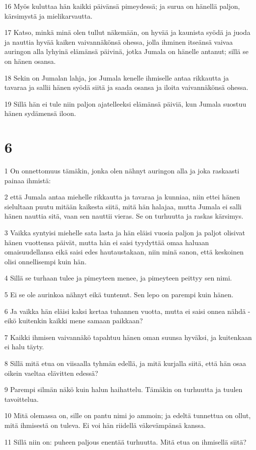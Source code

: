 \par 16 Myös kuluttaa hän kaikki päivänsä pimeydessä; ja surua on hänellä paljon, kärsimystä ja mielikarvautta.
\par 17 Katso, minkä minä olen tullut näkemään, on hyvää ja kaunista syödä ja juoda ja nauttia hyvää kaiken vaivannäkönsä ohessa, jolla ihminen itseänsä vaivaa auringon alla lyhyinä elämänsä päivinä, jotka Jumala on hänelle antanut; sillä se on hänen osansa.
\par 18 Sekin on Jumalan lahja, jos Jumala kenelle ihmiselle antaa rikkautta ja tavaraa ja sallii hänen syödä siitä ja saada osansa ja iloita vaivannäkönsä ohessa.
\par 19 Sillä hän ei tule niin paljon ajatelleeksi elämänsä päiviä, kun Jumala suostuu hänen sydämensä iloon.

\chapter{6}

\par 1 On onnettomuus tämäkin, jonka olen nähnyt auringon alla ja joka raskaasti painaa ihmistä:
\par 2 että Jumala antaa miehelle rikkautta ja tavaraa ja kunniaa, niin ettei hänen sielultaan puutu mitään kaikesta siitä, mitä hän halajaa, mutta Jumala ei salli hänen nauttia sitä, vaan sen nauttii vieras. Se on turhuutta ja raskas kärsimys.
\par 3 Vaikka syntyisi miehelle sata lasta ja hän eläisi vuosia paljon ja paljot olisivat hänen vuottensa päivät, mutta hän ei saisi tyydyttää omaa haluaan omaisuudellansa eikä saisi edes hautaustakaan, niin minä sanon, että keskoinen olisi onnellisempi kuin hän.
\par 4 Sillä se turhaan tulee ja pimeyteen menee, ja pimeyteen peittyy sen nimi.
\par 5 Ei se ole aurinkoa nähnyt eikä tuntenut. Sen lepo on parempi kuin hänen.
\par 6 Ja vaikka hän eläisi kaksi kertaa tuhannen vuotta, mutta ei saisi onnea nähdä - eikö kuitenkin kaikki mene samaan paikkaan?
\par 7 Kaikki ihmisen vaivannäkö tapahtuu hänen oman suunsa hyväksi, ja kuitenkaan ei halu täyty.
\par 8 Sillä mitä etua on viisaalla tyhmän edellä, ja mitä kurjalla siitä, että hän osaa oikein vaeltaa elävitten edessä?
\par 9 Parempi silmän näkö kuin halun haihattelu. Tämäkin on turhuutta ja tuulen tavoittelua.
\par 10 Mitä olemassa on, sille on pantu nimi jo ammoin; ja edeltä tunnettua on ollut, mitä ihmisestä on tuleva. Ei voi hän riidellä väkevämpänsä kanssa.
\par 11 Sillä niin on: puheen paljous enentää turhuutta. Mitä etua on ihmisellä siitä?

